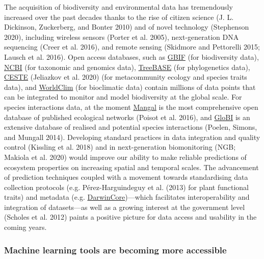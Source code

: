 \documentclass[11pt]{article}
\begin{document}
The acquisition of biodiversity and environmental data has tremendously
increased over the past decades thanks to the rise of citizen science
(J. L. Dickinson, Zuckerberg, and Bonter 2010) and of novel technology
(Stephenson 2020), including wireless sensors (Porter et al. 2005),
next-generation DNA sequencing (Creer et al. 2016), and remote sensing
(Skidmore and Pettorelli 2015; Lausch et al. 2016). Open access
databases, such as \href{https://www.gbif.org/}{GBIF} (for biodiversity
data), \href{https://www.ncbi.nlm.nih.gov/}{NCBI} (for taxonomic and
genomics data),
\href{https://www.treebase.org/treebase-web/home.html}{TreeBASE} (for
phylogenetics data), \href{https://icestes.github.io/}{CESTE} (Jeliazkov
et al. 2020) (for metacommunity ecology and species traits data), and
\href{https://www.worldclim.org/data/bioclim.html}{WorldClim} (for
bioclimatic data) contain millions of data points that can be integrated
to monitor and model biodiversity at the global scale. For species
interactions data, at the moment \href{https://mangal.io/\#/}{Mangal} is
the most comprehensive open database of published ecological networks
(Poisot et al. 2016), and
\href{https://www.globalbioticinteractions.org/about}{GloBI} is an
extensive database of realised and potential species interactions
(Poelen, Simons, and Mungall 2014). Developing standard practices in
data integration and quality control (Kissling et al. 2018) and in
next-generation biomonitoring (NGB; Makiola et al. 2020) would improve
our ability to make reliable predictions of ecosystem properties on
increasing spatial and temporal scales. The advancement of prediction
techniques coupled with a movement towards standardising data collection
protocols (e.g. Pérez-Harguindeguy et al. (2013) for plant functional
traits) and metadata (e.g.
\href{https://www.tdwg.org}{DarwinCore})---which facilitates
interoperability and integration of datasets---as well as a growing
interest at the government level (Scholes et al. 2012) paints a positive
picture for data access and usability in the coming years.

\hypertarget{machine-learning-tools-are-becoming-more-accessible}{%
\subsubsection{Machine learning tools are becoming more
accessible}\label{machine-learning-tools-are-becoming-more-accessible}}
\end{document}
